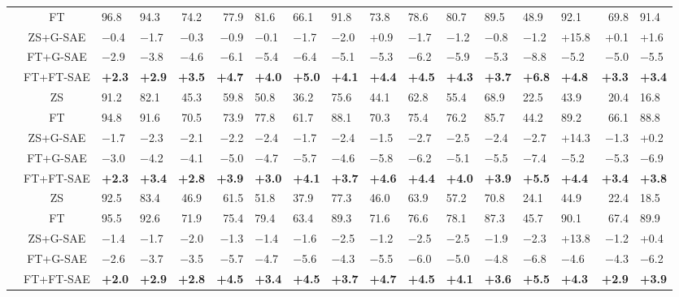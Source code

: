 \begin{table}[!htbp]
{\begin{tabular}{lc A B C D E F G H I J K L M N O}
  & FT            & 96.8 & 94.3 & 74.2 & 77.9 & 81.6 & 66.1 & 91.8 & 73.8 & 78.6 & 80.7 & 89.5 & 48.9 & 92.1 & 69.8 & 91.4 \\
  \cmidrule(l){2-17}
  & ZS+G-SAE      & $-$0.4 & $-$1.7 & $-$0.3 & $-$0.9 & $-$0.1 & $-$1.7 & $-$2.0 & +0.9 & $-$1.7 & $-$1.2 & $-$0.8 & $-$1.2 & +15.8 & +0.1 & +1.6 \\
  & FT+G-SAE      & $-$2.9 & $-$3.8 & $-$4.6 & $-$6.1 & $-$5.4 & $-$6.4 & $-$5.1 & $-$5.3 & $-$6.2 & $-$5.9 & $-$5.3 & $-$8.8 & $-$5.2 & $-$5.0 & $-$5.5 \\
  & FT+FT-SAE     & \bf +2.3 & \bf +2.9 & \bf +3.5 & \bf +4.7 & \bf +4.0 & \bf +5.0 & \bf +4.1 & \bf +4.4 & \bf +4.5 & \bf +4.3 & \bf +3.7 & \bf +6.8 & \bf +4.8 & \bf +3.3 & \bf +3.4 \\
\midrule
{}
 & ZS               & 91.2 & 82.1 & 45.3 & 59.8 & 50.8 & 36.2 & 75.6 & 44.1 & 62.8 & 55.4 & 68.9 & 22.5 & 43.9 & 20.4 & 16.8 \\
  & FT            & 94.8 & 91.6 & 70.5 & 73.9 & 77.8 & 61.7 & 88.1 & 70.3 & 75.4 & 76.2 & 85.7 & 44.2 & 89.2 & 66.1 & 88.8 \\
  \cmidrule(l){2-17}
  & ZS+G-SAE      & $-$1.7 & $-$2.3 & $-$2.1 & $-$2.2 & $-$2.4 & $-$1.7 & $-$2.4 & $-$1.5 & $-$2.7 & $-$2.5 & $-$2.4 & $-$2.7 & +14.3 & $-$1.3 & +0.2 \\
  & FT+G-SAE      & $-$3.0 & $-$4.2 & $-$4.1 & $-$5.0 & $-$4.7 & $-$5.7 & $-$4.6 & $-$5.8 & $-$6.2 & $-$5.1 & $-$5.5 & $-$7.4 & $-$5.2 & $-$5.3 & $-$6.9 \\
  & FT+FT-SAE     & \bf +2.3 & \bf +3.4 & \bf +2.8 & \bf +3.9 & \bf +3.0 & \bf +4.1 & \bf +3.7 & \bf +4.6 & \bf +4.4 & \bf +4.0 & \bf +3.9 & \bf +5.5 & \bf +4.4 & \bf +3.4 & \bf +3.8 \\
\midrule
{}
& ZS               & 92.5 & 83.4 & 46.9 & 61.5 & 51.8 & 37.9 & 77.3 & 46.0 & 63.9 & 57.2 & 70.8 & 24.1 & 44.9 & 22.4 & 18.5 \\
  & FT           & 95.5 & 92.6 & 71.9 & 75.4 & 79.4 & 63.4 & 89.3 & 71.6 & 76.6 & 78.1 & 87.3 & 45.7 & 90.1 & 67.4 & 89.9 \\
  \cmidrule(l){2-17}
  & ZS+G-SAE      & $-$1.4 & $-$1.7 & $-$2.0 & $-$1.3 & $-$1.4 & $-$1.6 & $-$2.5 & $-$1.2 & $-$2.5 & $-$2.5 & $-$1.9 & $-$2.3 & +13.8 & $-$1.2 & +0.4 \\
  & FT+G-SAE      & $-$2.6 & $-$3.7 & $-$3.5 & $-$5.7 & $-$4.7 & $-$5.6 & $-$4.3 & $-$5.5 & $-$6.0 & $-$5.0 & $-$4.8 & $-$6.8 & $-$4.6 & $-$4.3 & $-$6.2 \\
  & FT+FT-SAE     & \bf +2.0 & \bf +2.9 & \bf +2.8 & \bf +4.5 & \bf +3.4 & \bf +4.5 & \bf +3.7 & \bf +4.7 & \bf +4.5 & \bf +4.1 & \bf +3.6 & \bf +5.5 & \bf +4.3 & \bf +2.9 & \bf +3.9 \\
\bottomrule
\end{tabular}%
}
\end{table}